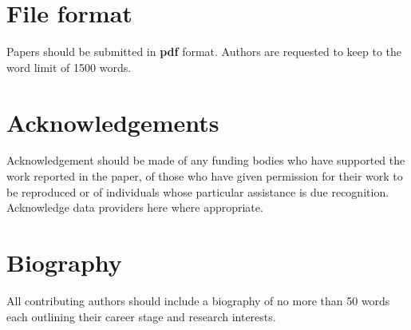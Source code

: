 \documentclass[11pt]{article}
\begin{document}
\section{File format}

Papers should be submitted in \textbf{pdf} format. Authors are requested to keep to the word limit of 1500 words. 

\section{Acknowledgements}

Acknowledgement should be made of any funding bodies who have supported the work reported in the paper, of those who have given permission for their work to be reproduced or of individuals whose particular assistance is due recognition. Acknowledge data providers here where appropriate.

\section{Biography}
All contributing authors should include a biography of no more than 50 words each outlining their career stage and research interests.





\end{document}
